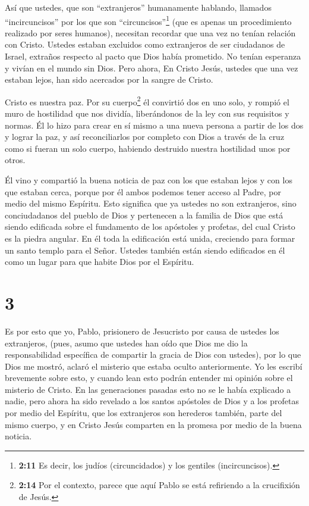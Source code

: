  Así que ustedes, que son ``extranjeros'' humanamente
hablando, llamados ``incircuncisos'' por los que son
``circuncisos''\footnote{\textbf{2:11} Es decir, los judíos
  (circuncidados) y los gentiles (incircuncisos).} (que es apenas un
procedimiento realizado por seres humanos), necesitan recordar
 que una vez no tenían relación con Cristo. Ustedes estaban
excluidos como extranjeros de ser ciudadanos de Israel, extraños
respecto al pacto que Dios había prometido. No tenían esperanza y vivían
en el mundo sin Dios.  Pero ahora, En Cristo Jesús, ustedes
que una vez estaban lejos, han sido acercados por la sangre de Cristo.

 Cristo es nuestra paz. Por su cuerpo\footnote{\textbf{2:14}
  Por el contexto, parece que aquí Pablo se está refiriendo a la
  crucifixión de Jesús.} él convirtió dos en uno solo, y rompió el muro
de hostilidad que nos dividía,  liberándonos de la ley con
sus requisitos y normas. Él lo hizo para crear en sí mismo a una nueva
persona a partir de los dos y lograr la paz,  y así
reconciliarlos por completo con Dios a través de la cruz como si fueran
un solo cuerpo, habiendo destruido nuestra hostilidad unos por otros.

 Él vino y compartió la buena noticia de paz con los que
estaban lejos y con los que estaban cerca,  porque por él
ambos podemos tener acceso al Padre, por medio del mismo Espíritu.
 Esto significa que ya ustedes no son extranjeros, sino
conciudadanos del pueblo de Dios y pertenecen a la familia de Dios
 que está siendo edificada sobre el fundamento de los
apóstoles y profetas, del cual Cristo es la piedra angular.
 En él toda la edificación está unida, creciendo para
formar un santo templo para el Señor.  Ustedes también
están siendo edificados en él como un lugar para que habite Dios por el
Espíritu.

\hypertarget{section-2}{%
\section{3}\label{section-2}}

 Es por esto que yo, Pablo, prisionero de Jesucristo por
causa de ustedes los extranjeros,  (pues, asumo que ustedes
han oído que Dios me dio la responsabilidad específica de compartir la
gracia de Dios con ustedes),  por lo que Dios me mostró,
aclaró el misterio que estaba oculto anteriormente. Yo les escribí
brevemente sobre esto,  y cuando lean esto podrán entender
mi opinión sobre el misterio de Cristo.  En las generaciones
pasadas esto no se le había explicado a nadie, pero ahora ha sido
revelado a los santos apóstoles de Dios y a los profetas por medio del
Espíritu,  que los extranjeros son herederos también, parte
del mismo cuerpo, y en Cristo Jesús comparten en la promesa por medio de
la buena noticia.

